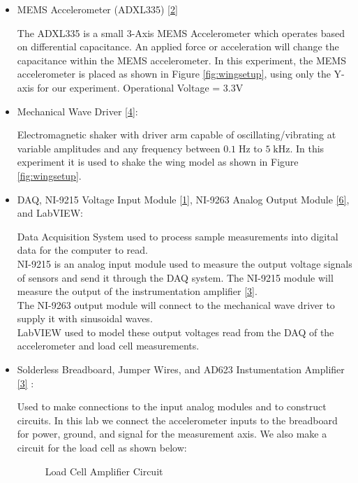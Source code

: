 \documentclass{article}
\begin{document}
\begin{itemize}
\item MEMS Accelerometer (ADXL335) \hyperlink{datasheets}{[2]}
\vspace{1mm}

The ADXL335 is a small 3-Axis MEMS Accelerometer which operates based on differential capacitance. An applied force or acceleration will change the capacitance within the MEMS accelerometer. In this experiment, the MEMS accelerometer is placed as shown in Figure \ref{fig:wingsetup}, using only the Y-axis for our experiment. Operational Voltage = $3.3\text{V}$
\vspace{2.5mm}

\item Mechanical Wave Driver \hyperlink{datasheets}{[4]}: 
\vspace{1mm}

Electromagnetic shaker with driver arm capable of oscillating/vibrating at variable amplitudes and any frequency between $0.1\; \text{Hz}$ to $5\; \text{kHz}$. In this experiment it is used to shake the wing model as shown in Figure \ref{fig:wingsetup}. 
\vspace{2.5mm}

\item DAQ, NI-9215 Voltage Input Module \hyperlink{datasheets}{[1]}, NI-9263 Analog Output Module \hyperlink{datasheets}{[6]},  and LabVIEW:
\vspace{1mm}

Data Acquisition System used to process sample measurements into digital data for the computer to read.\\[5pt]
NI-9215 is an analog input module used to measure the output voltage signals of sensors and send it through the DAQ system. The NI-9215 module will measure the output of the instrumentation amplifier \hyperlink{datasheets}{[3]}.\\[5pt]
The NI-9263 output module will connect to the mechanical wave driver to supply it with sinusoidal waves.\\[5pt]
LabVIEW used to model these output voltages read from the DAQ of the accelerometer and load cell measurements. 

\item Solderless Breadboard, Jumper Wires, and AD623 Instumentation Amplifier \hyperlink{datasheets}{[3]} : 
\vspace{1mm}

Used to make connections to the input analog modules and to construct circuits. In this lab we connect the accelerometer inputs to the breadboard for power, ground, and signal for the measurement axis. We also make a circuit for the load cell as shown below:

\begin{figure}[H]
    \centering
    \caption{Load Cell Amplifier Circuit}
    \label{fig:ampcircuit}
\end{figure}

\end{itemize}
\end{document}
